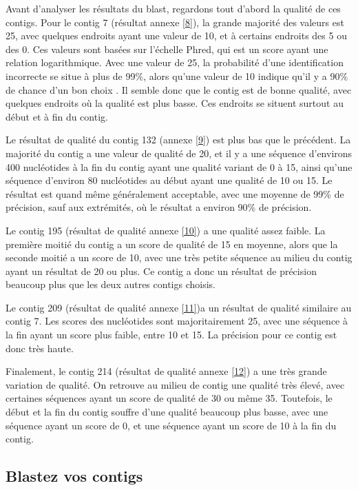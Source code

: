 \documentclass[10.8pt]{article} %
\begin{document}
Avant d'analyser les résultats du blast, regardons tout d'abord la qualité de ces contigs. Pour le contig 7 (résultat annexe \ref{8}),
la grande majorité des valeurs est 25, avec quelques endroits ayant une valeur de 10, et à certains endroits des 5 ou des 0.
Ces valeurs sont basées sur l'échelle Phred, qui est un score ayant une relation logarithmique. Avec une valeur de 25, 
la probabilité d'une identification incorrecte se situe à plus de 99\%, alors qu'une valeur de 10 indique qu'il y a 90\% de chance
d'un bon choix . Il semble donc que le contig est de bonne qualité, avec quelques endroits où la qualité est plus basse. Ces endroits
se situent surtout au début et à fin du contig.

Le résultat de qualité du contig 132 (annexe \ref{9}) est plus bas que le précédent. La majorité du contig a une valeur de qualité
de 20, et il y a une séquence d'environs 400 nucléotides à la fin du contig ayant une qualité variant de 0 à 15, ainsi qu'une séquence
d'environ 80 nucléotides au début ayant une qualité de 10 ou 15. Le résultat est quand même généralement acceptable, avec une moyenne de
99\% de précision, sauf aux extrémités, où le résultat a environ 90\% de précision.

Le contig 195 (résultat de qualité annexe \ref{10}) a une qualité assez faible. La première moitié du contig a un score de
qualité de 15 en moyenne, alors que la seconde moitié a un score de 10, avec une très petite séquence au milieu du contig
ayant un résultat de 20 ou plus. Ce contig a donc un résultat de précision beaucoup plus que les deux autres contigs choisis.

Le contig 209 (résultat de qualité annexe \ref{11})a un résultat de qualité similaire au contig 7. Les scores des nucléotides 
sont majoritairement 25, avec une séquence à la fin ayant un score plus faible, entre 10 et 15. La précision pour ce contig est
donc très haute.

Finalement, le contig 214 (résultat de qualité annexe \ref{12}) a une très grande variation de qualité. On retrouve au milieu
de contig une qualité très élevé, avec certaines séquences ayant un score de qualité de 30 ou même 35. Toutefois, le début et
la fin du contig souffre d'une qualité beaucoup plus basse, avec une séquence ayant un score de 0, et une séquence ayant un score
de 10 à la fin du contig.

\subsection[Blast des contigs]{Blastez vos contigs}
\end{document}
